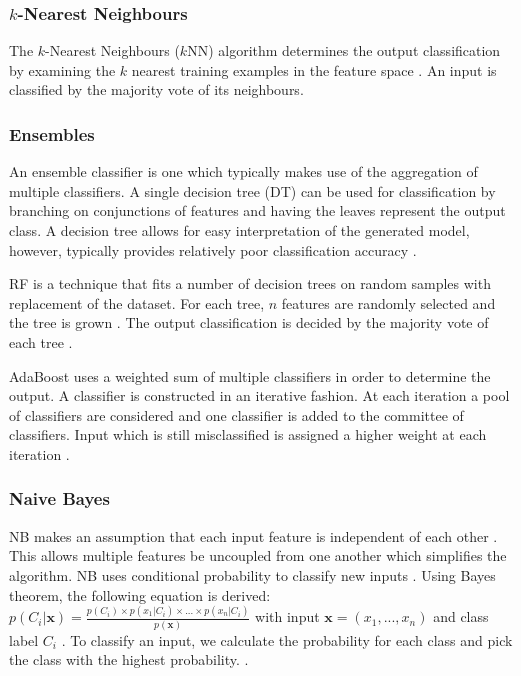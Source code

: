 \documentclass{sig-alternate-05-2015}
\begin{document}
	\subsubsection{$k$-Nearest Neighbours}
	The $k$-Nearest Neighbours ($k$NN) algorithm determines the output classification by examining the $k$ nearest training examples in the feature space \cite{6313426}. An input is classified by the majority vote of its neighbours.
	
	\subsubsection{Ensembles}
	An ensemble classifier is one which typically makes use of the aggregation of multiple classifiers. A single decision tree (DT) can be used for classification by branching on conjunctions of features and having the leaves represent the output class. A decision tree allows for easy interpretation of the generated model, however, typically provides relatively poor classification accuracy \cite{doi:10.1021/ci034160g}. 
	
	RF is a technique that fits a number of decision trees on random samples with replacement of the dataset. For each tree, $n$ features are randomly selected and the tree is grown \cite{WIDM:WIDM1072}. The output classification is decided by the majority vote of each tree \cite{WIDM:WIDM1072}.
	
	AdaBoost \cite{FREUND1997119} uses a weighted sum of multiple classifiers in order to determine the output. A classifier is constructed in an iterative fashion. At each iteration a pool of classifiers are considered and one classifier is added to the committee of classifiers. Input which is still misclassified is assigned a higher weight at each iteration \cite{Bergstra2006, rojas2009adaboost}.
	
	\subsubsection{Naive Bayes}
	NB makes an assumption that each input feature is independent of each other \cite{Lewis1998, rish2001empirical}. This allows multiple features be uncoupled from one another which simplifies the algorithm. NB uses conditional probability to classify new inputs \cite{Lewis1998}. Using Bayes theorem, the following equation is derived: $p(C_i|\textbf{x}) = \frac{p(C_i) \times p(x_1|C_i) \times...\times p(x_n|C_i)}{p(\textbf{x})}$ with input $\textbf{x} = (x_1,...,x_n)$ and class label $C_i$ \cite{Lewis1998, rish2001empirical}. To classify an input, we calculate the probability for each class and pick the class with the highest probability. \cite{Lewis1998}.
	
\end{document}
